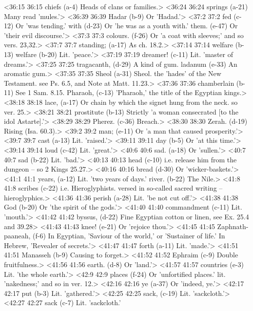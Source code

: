 <36:15 36:15  chiefs (a-4)  Heads of clans or families.>
<36:24 36:24  springs (a-21)  Many read 'mules.'>
<36:39 36:39  Hadar (b-9)  Or 'Hadad.'>
<37:2 37:2  fed (c-12)  Or 'was tending.'
  with (d-23)  Or 'he was as a youth with.'
  them. (e-47)  Or 'their evil discourse.'>
<37:3 37:3  colours. (f-26)  Or 'a coat with sleeves;' and so vers. 23,32.>
<37:7 37:7  standing; (a-17)  As ch. 18.2.>
<37:14 37:14  welfare (b-13)  welfare (b-20)
  Lit. 'peace.'>
<37:19 37:19  dreamer! (c-11)  Lit. 'master of dreams.'>
<37:25 37:25  tragacanth, (d-29)  A kind of gum.
  ladanum (e-33)  An aromatic gum.>
<37:35 37:35  Sheol (a-31)  Sheol. the 'hades' of the New Testament. see Ps. 6.5, and  Note at Matt. 11.23.>
<37:36 37:36  chamberlain (b-11)  See 1 Sam. 8.15.
  Pharaoh, (c-13)  'Pharaoh,' the title of the Egyptian kings.>
<38:18 38:18  lace, (a-17)  Or chain by which the signet hung from the neck. so ver. 25.>
<38:21 38:21  prostitute (b-13)  Strictly 'a woman consecrated [to the idol Astarte].'>
<38:29 38:29  Pherez. (c-36)  Breach.>
<38:30 38:30  Zerah. (d-19)  Rising (Isa. 60.3).>
<39:2 39:2  man; (e-11)  Or 'a man that caused prosperity.'>
<39:7 39:7  cast (a-13)  Lit. 'raised.'>
<39:11 39:11  day (b-5)  Or 'at this time.'>
<39:14 39:14  loud (c-42)  Lit. 'great.'>
<40:6 40:6  sad. (a-18)  Or 'sullen.'>
<40:7 40:7  sad (b-22)  Lit. 'bad.'>
<40:13 40:13  head (c-10)  i.e. release him from the dungeon -- so 2 Kings 25.27.>
<40:16 40:16  bread (d-30)  Or 'wicker-baskets.'>
<41:1 41:1  years, (a-12)  Lit. 'two years of days.'
  river. (b-22)  The Nile.>
<41:8 41:8  scribes (c-22)  i.e. Hieroglyphists. versed in so-called sacred writing --  hieroglyphics.>
<41:36 41:36  perish (a-28)  Lit. 'be not cut off.'>
<41:38 41:38  God (b-20)  Or 'the spirit of the gods.'>
<41:40 41:40  commandment (c-11)  Lit. 'mouth.'>
<41:42 41:42  byssus, (d-22)  Fine Egyptian cotton or linen, see Ex. 25.4 and 39.28>
<41:43 41:43  knee! (e-21)  Or 'rejoice thou.'>
<41:45 41:45  Zaphnath-paaneah, (f-6)  In Egyptian, 'Saviour of the world,' or 'Sustainer of life.'  In Hebrew, 'Revealer of secrets.'>
<41:47 41:47  forth (a-11)  Lit. 'made.'>
<41:51 41:51  Manasseh (b-9)  Causing to forget.>
<41:52 41:52  Ephraim (c-9)  Double fruitfulness.>
<41:56 41:56  earth. (d-8)  Or 'land.'>
<41:57 41:57  countries (e-3)  Lit. 'the whole earth.'>
<42:9 42:9  places (f-24)  Or 'unfortified places.' lit. 'nakedness;' and so in ver. 12.>
<42:16 42:16  ye (a-37)  Or 'indeed, ye.'>
<42:17 42:17  put (b-3)  Lit. 'gathered.'>
<42:25 42:25  sack, (c-19) Lit. 'sackcloth.'>
<42:27 42:27  sack (c-7)  Lit. 'sackcloth.'
